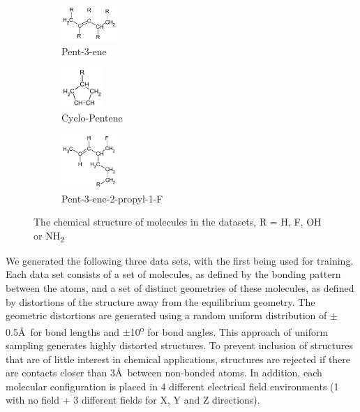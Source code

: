 \documentclass[twoside,11pt]{article}
\begin{document}
\begin{figure}[h!]
\centering
\begin{subfigure}{.3\textwidth}
  \centering
  \includegraphics[width=80px]{pent3ene.pdf}
  \caption{Pent-3-ene}
  \label{fig:pent3ene}
\end{subfigure}%
\begin{subfigure}{.3\textwidth}
  \centering
  \includegraphics[width=60px]{RcycloPenteneHs.pdf}
  \caption{Cyclo-Pentene}
  \label{fig:cycloPen}
\end{subfigure}
\begin{subfigure}{.3\textwidth}
  \centering
  \includegraphics[width=80px]{pent3ene2propNOF.pdf}
  \caption{Pent-3-ene-2-propyl-1-F}
  \label{fig:propSub}
\end{subfigure}
\caption{The chemical structure of molecules in the datasets, R = H, F, OH or NH\textsubscript{2}}
\label{fig:Molecules}
\end{figure}
We generated the following three data sets, with the first being used for training. Each data set consists of a set of molecules, as defined by the bonding pattern between the atoms, and a set of distinct geometries of these molecules, as defined by distortions of the structure away from the equilibrium geometry. The geometric distortions are generated using a random uniform distribution of $\pm$0.5\AA\ for bond lengths and $\pm$10\textsuperscript{o} for bond angles. This approach of uniform sampling generates highly distorted structures. To prevent inclusion of structures that are of little interest in chemical applications, structures are rejected if there are contacts closer than 3\AA\ between non-bonded atoms. In addition, each molecular configuration is placed in 4 different electrical field environments (1 with no field + 3 different fields for X, Y and Z directions).
\end{document}
